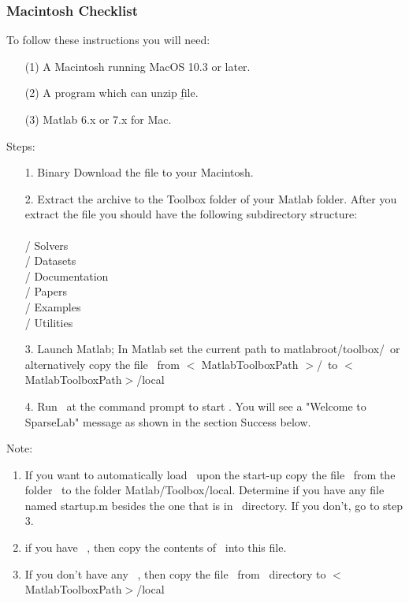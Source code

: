 \documentclass{article}
\begin{document}
\subsubsection{Macintosh Checklist}
To follow these instructions you will need:
\begin{itemize}
\item[(1)] A Macintosh running MacOS 10.3 or later.
\item[(2)] A program which can unzip \dotzip\b
file.
\item[(3)] Matlab 6.x or 7.x for Mac.
\end{itemize}
Steps:\\
\begin{itemize}
\item[1.] Binary Download the file {\tt \WLName \dotzip} to your
Macintosh.
\item[2.] Extract the archive to the Toolbox folder of your Matlab
folder. After you extract the file you should have the following
subdirectory structure: \\
\WLName \\
\WLName / Solvers\\
\WLName / Datasets \\
\WLName / Documentation\\
\WLName / Papers\\
\WLName / Examples\\
\WLName / Utilities \\

\item[3.] Launch Matlab; In Matlab set the current path to
matlabroot/toolbox/\WLName\ or alternatively copy the file
\WavePath\ from $<$ MatlabToolboxPath $>$/\WLName\ to
$<$MatlabToolboxPath$>$/local
\item[4.] Run \WavePath\ at the command prompt to start \WaveLab.
You will see a "Welcome to SparseLab" message as shown in the section Success below.
\end{itemize}
Note: \\
\begin{enumerate}
\item If you want to automatically load \WLName\ upon the start-up
copy the file \WavePath\ from the folder \WLName\ to the folder
Matlab/Toolbox/local. Determine if you have any file named startup.m
besides the one that is in \WLName\ directory. If you don't, go to
step 3.\\
 \item if you have \Startup\ , then copy the contents of \WavePath\
 into this file.
 \item If you don't have any \Startup\ , then copy the file \Startup\ from
 \WLName\ directory to
 $<$MatlabToolboxPath$>$/local
 \end{enumerate}
\end{document}
